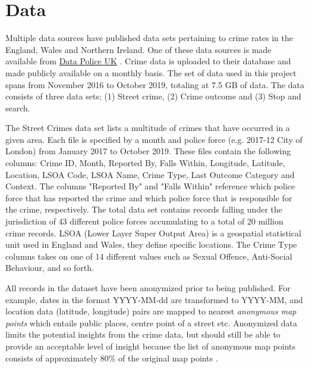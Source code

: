 \documentclass[main.tex]{subfiles}
\begin{document}
\section{Data}
Multiple data sources have published data sets pertaining to crime rates in the England, Wales and Northern Ireland. One of these data sources is made available from \hyperlink{https://data.police.uk/}{Data Police UK} \cite{dataPolice}. Crime data is uploaded to their database and made publicly available on a monthly basis. The set of data used in this project spans from November 2016 to October 2019, totaling at 7.5 GB of data. The data consists of three data sets; (1) Street crime, (2) Crime outcome and (3) Stop and search. 


The Street Crimes data set lists a multitude of crimes that have occurred in a given area. Each file is specified by a month and police force (e.g. 2017-12 City of London) from January 2017 to October 2019. These files contain the following columns: Crime ID, Month, Reported By, Falls Within, Longitude, Latitude, Location, LSOA Code, LSOA Name, Crime Type, Last Outcome Category and Context. The columns "Reported By" and "Falls Within" reference which police force that has reported the crime and which police force that is responsible for the crime, respectively. The total data set contains records falling under the jurisdiction of 43 different police forces accumulating to a total of 20 million crime records. LSOA (Lower Layer Super Output Area) is a geospatial statistical unit used in England and Wales, they define specific locations. The Crime Type columns takes on one of 14 different values such as Sexual Offence, Anti-Social Behaviour, and so forth. 

All records in the dataset have been anonymized prior to being published. For example, dates in the format YYYY-MM-dd are transformed to YYYY-MM, and location data (latitude, longitude) pairs are mapped to nearest \textit{anonymous map points} which entails public places, centre point of a street etc. Anonymized data limits the potential insights from the crime data, but should still be able to provide an acceptable level of insight because the list of anonymous map points consists of approximately 80\% of the original map points \cite{dataPoliceAbout}.
\end{document}
